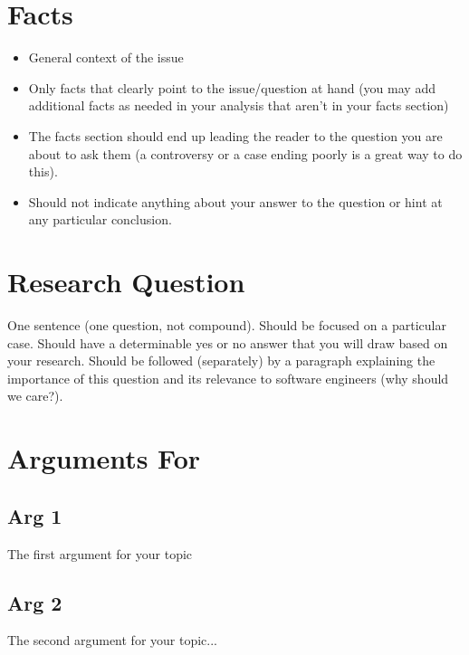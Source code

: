\documentclass[11pt]{article}
\begin{document}
\begin{multicols}{2}
\setcounter{page}{1}
\section{Facts}

\begin{itemize}

\item General context of the issue 
\item Only facts that clearly point to the issue/question at hand (you may add additional facts as needed in your analysis that aren't in your facts section) 
\item The facts section should end up leading the reader to the question you are about to ask them (a controversy or a case ending poorly is a great way to do this). 
\item Should not indicate anything about your answer to the question or hint at any particular conclusion.
\cite{handout} 
\end{itemize}



\section{Research Question}
One sentence (one question, not compound). Should be focused on a particular case. Should have a determinable yes or no answer that you will draw based on your research.  Should be followed (separately) by a paragraph explaining the importance of this question and its relevance to software engineers (why should we care?). \cite{handout}


\section{Arguments For}
\subsection{Arg 1}
The first argument for your topic
\subsection{Arg 2}
The second argument for your topic...

\end{multicols}
\end{document}
